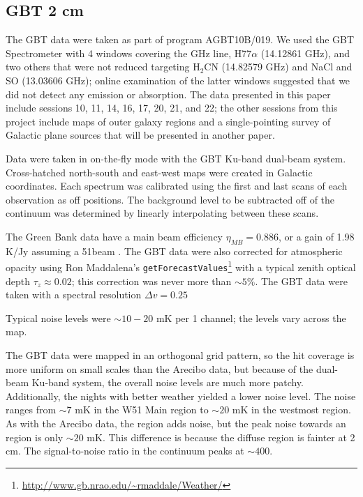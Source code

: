 \subsection{GBT 2 cm}
The GBT data were taken as part of program AGBT10B/019.  We used the GBT
Spectrometer with 4 windows covering the  GHz line,
H77$\alpha$ (14.12861 GHz), and two others that were not reduced targeting H$_2$CN (14.82579
GHz) and NaCl and SO (13.03606 GHz); online examination of the latter windows
suggested that we did not detect any emission or absorption.
The data presented in this paper
include sessions 10, 11, 14, 16, 17, 20, 21, and 22; the other sessions from
this project include maps of outer galaxy regions and a single-pointing survey
of Galactic plane sources that will be presented in another paper. 

Data were taken in on-the-fly mode with the GBT Ku-band dual-beam system.
Cross-hatched north-south and east-west maps were created in Galactic
coordinates. 
Each spectrum was calibrated using the first and last scans of each observation
as off positions.  The background level to be subtracted off of the
continuum was determined by linearly interpolating between these scans.

The Green Bank data have a main beam efficiency $\eta_{MB} = 0.886$, or a gain
of 1.98 K/Jy assuming a 51\arcsec beam \citep[see][for additional
discussion]{Mangum2013a}.  The GBT data were also corrected for atmospheric
opacity using Ron Maddalena's
\texttt{getForecastValues}\footnote{\url{http://www.gb.nrao.edu/~rmaddale/Weather/}}
with a typical zenith optical depth $\tau_{z}\approx0.02$; this
correction was never more than $\sim5\%$.
The GBT data were taken with a spectral resolution $\Delta v = 0.25$ \kms

Typical noise levels were $\sim10-20$ mK per 1 \kms channel; the levels vary
across the map.  

The GBT data were mapped in an orthogonal grid pattern, so the hit coverage is
more uniform on small scales than the Arecibo data, but because of the
dual-beam Ku-band system, the overall noise levels are much more patchy.
Additionally, the nights with
better weather yielded a lower noise level.  The noise ranges from $\sim7$ mK
in the W51 Main region to $\sim 20$ mK in the westmost region.  As with the
Arecibo data, the \hii region adds noise, but the peak noise towards an \hii
region is only $\sim 20$ mK.  This difference is because the diffuse \hii
region is fainter at 2 cm.  The signal-to-noise ratio in the continuum peaks at
$\sim 400$.

